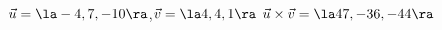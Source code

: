 {$\vec u = \la -4,7,-10\ra$,\quad $\vec v = \la 4,4,1\ra$
}
{$\vec u\times\vec v = \la 47,-36,-44\ra$
}
